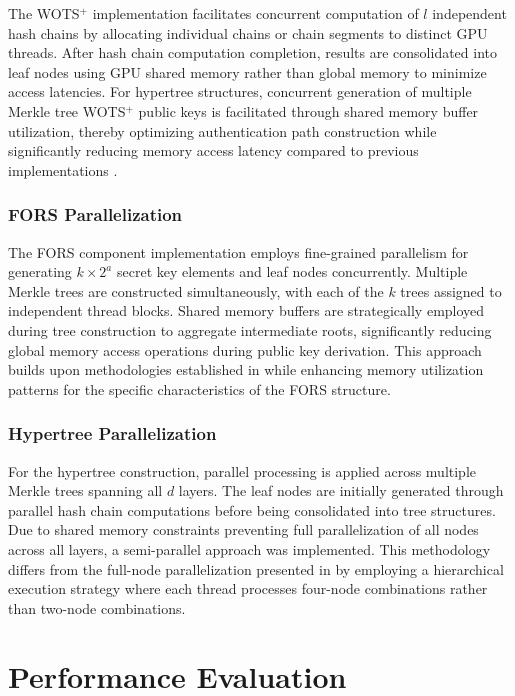 \documentclass[journal]{IEEEtran}
\begin{document}
The WOTS$^+$ implementation facilitates concurrent computation of $l$ independent hash chains by allocating individual chains or chain segments to distinct GPU threads. After hash chain computation completion, results are consolidated into leaf nodes using GPU shared memory rather than global memory to minimize access latencies. For hypertree structures, concurrent generation of multiple Merkle tree WOTS$^+$ public keys is facilitated through shared memory buffer utilization, thereby optimizing authentication path construction while significantly reducing memory access latency compared to previous implementations \cite{Kim2024}.

\subsubsection{FORS Parallelization}

The FORS component implementation employs fine-grained parallelism for generating $k \times 2^a$ secret key elements and leaf nodes concurrently. Multiple Merkle trees are constructed simultaneously, with each of the $k$ trees assigned to independent thread blocks. Shared memory buffers are strategically employed during tree construction to aggregate intermediate roots, significantly reducing global memory access operations during public key derivation. This approach builds upon methodologies established in \cite{Wang2025} while enhancing memory utilization patterns for the specific characteristics of the FORS structure.

\subsubsection{Hypertree Parallelization}

For the hypertree construction, parallel processing is applied across multiple Merkle trees spanning all $d$ layers. The leaf nodes are initially generated through parallel hash chain computations before being consolidated into tree structures. Due to shared memory constraints preventing full parallelization of all nodes across all layers, a semi-parallel approach was implemented. This methodology differs from the full-node parallelization presented in \cite{Wang2025} by employing a hierarchical execution strategy where each thread processes four-node combinations rather than two-node combinations.


\section{Performance Evaluation}\label{sec:evaluation}
\end{document}

